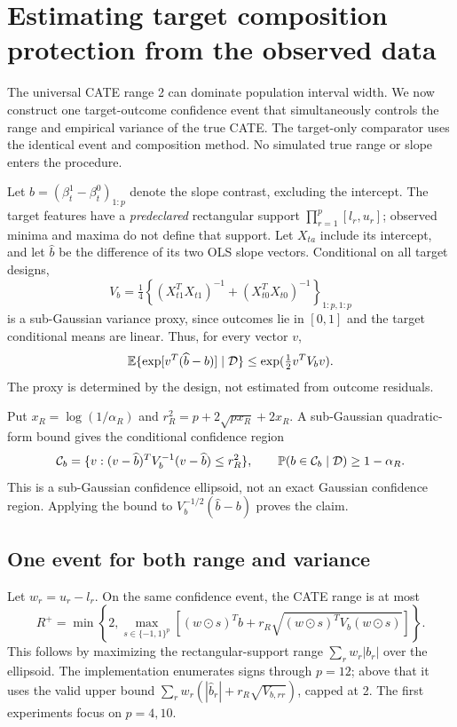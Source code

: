 \section{Estimating target composition protection from the observed data}
\label{sec:target-protection}

The universal CATE range 2 can dominate population interval width. We now
construct one target-outcome confidence event that simultaneously controls the
range and empirical variance of the true CATE. The target-only comparator uses
the identical event and composition method. No simulated true range or slope
enters the procedure.

Let $b=(\beta_t^1-\beta_t^0)_{1:p}$ denote the slope contrast, excluding the
intercept. The target features have a \emph{predeclared} rectangular support
$\prod_{r=1}^p[l_r,u_r]$; observed minima and maxima do not define that support.
Let $X_{ta}$ include its intercept, and let $\widehat b$ be the difference of
its two OLS slope vectors. Conditional on all target designs,
\[
 V_b=\tfrac14\left\{(X_{t1}^TX_{t1})^{-1}+
                         (X_{t0}^TX_{t0})^{-1}\right\}_{1:p,1:p}
\]
is a sub-Gaussian variance proxy, since outcomes lie in $[0,1]$ and the target
conditional means are linear. Thus, for every vector $v$,
\[
 \mathbb E\{\exp[v^T(\widehat b-b)]\mid\mathcal D\}
 \le\exp(\tfrac12v^TV_bv).
\]
The proxy is determined by the design, not estimated from outcome residuals.

Put $x_R=\log(1/\alpha_R)$ and
$r_R^2=p+2\sqrt{p x_R}+2x_R$. A sub-Gaussian quadratic-form bound
\citep{hsu2012} gives the conditional confidence region
\[
 \mathcal C_b=\{v:(v-\widehat b)^TV_b^{-1}(v-\widehat b)\le r_R^2\},
 \qquad\mathbb P(b\in\mathcal C_b\mid\mathcal D)\ge1-\alpha_R.
\]
This is a sub-Gaussian confidence ellipsoid, not an exact Gaussian confidence
region. Applying the bound to $V_b^{-1/2}(\widehat b-b)$ proves the claim.

\subsection{One event for both range and variance}

Let $w_r=u_r-l_r$. On the same confidence event, the CATE range is at most
\[
 R^+=\min\left\{2,\max_{s\in\{-1,1\}^p}
   \left[(w\odot s)^T\widehat b+
        r_R\sqrt{(w\odot s)^TV_b(w\odot s)}\right]\right\}.
\]
This follows by maximizing the rectangular-support range
$\sum_r w_r|b_r|$ over the ellipsoid. The implementation enumerates signs through
$p=12$; above that it uses the valid upper bound
$\sum_r w_r(|\widehat b_r|+r_R\sqrt{V_{b,rr}})$, capped at 2.
The first experiments focus on $p=4,10$.

